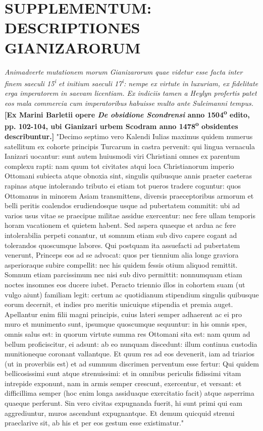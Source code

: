 \documentclass[12pt]{article}
\begin{document}
	\clearpage
	{\small
		\section{SUPPLEMENTUM: DESCRIPTIONES GIANIZARORUM}
		\textit{Animadverte mutationem morum Gianizarorum quae videtur esse facta inter finem saeculi 15\textsuperscript{i} et initium saeculi 17\textsuperscript{i}: nempe ex virtute in luxuriam, ex fidelitate erga imperatorem in saevam licentiam. Ex indiciis tamen a Heylyn profertis patet eos mala commercia cum imperatoribus habuisse multo ante Suleimanni tempus.}\\
		
		\noindent\textbf{[Ex Marini Barletii opere \textit{De obsidione Scondrensi} anno 1504\textsuperscript{o} edito, pp. 102-104, ubi Gianizari urbem Scodram anno 1478\textsuperscript{o} obsidentes describuntur.]} "Decimo septimo vero Kalendi Iulias maximus quidem numerus satellitum ex cohorte principis Turcarum in castra pervenit: qui lingua vernacula Ianizari uocantur: sunt autem huiusmodi viri Christiani omnes ex parentum complexu rapti: nam quum tot civitates atqui loca Christianorum imperio Ottomani subiecta atque obnoxia sint, singulis quibusque annis praeter caeteras rapinas atque intolerando tributo ei etiam tot pueros tradere coguntur: quos Ottomanus in minorem Asiam transmittens, diversis praeceptoribus armorum et belli peritis coalendos erudiendosque usque ad pubertatem commitit: ubi ad varios usus vitae se praecipue militae assidue exercentur: nec fere ullam temporis horam vacationem et quietem habent. Sed aspera quaeque et ardua ac fere intolerabilia perpeti conantur, ut somnum etiam sub divo capere cogant ad tolerandos quoscumque labores. Qui postquam ita assuefacti ad pubertatem venerunt, Princeps eos ad se advocat: quos per tiennium alia longe graviora asperioraque subire compellit: nec his quidem fessis otium aliquod remittit. Somnum etiam parcissimum nec nisi sub divo permittit: nonnumquam etiam noctes insomnes eos ducere iubet. Peracto triennio illos in cohortem suam (ut vulgo aiunt) familiam legit: certum ac quotidianum stipendium singulis quibusque eorum decernit, et indies pro meritis unicuique stipendia et premia auget. Apellantur enim filii magni principis, cuius lateri semper adhaerent ac ei pro muro et munimento sunt, ipsumque quoscumque sequuntur: in his omnis spes, omnis salus est: in quorum virtute summa res Ottomani sita est: nam quum ad bellum proficiscitur, ei adsunt: ab eo nunquam discedunt: illum continua custodia munitioneque coronant vallantque. Et quum res ad eos devenerit, iam ad triarios (ut in proverbiis est) et ad summum discrimen perventum esse fertur: Qui quidem bellicosissimi sunt atque strenuissimi: et in omnibus periculis fidissimi vitam intrepide exponunt, nam in armis semper crescunt, exercentur, et versant: et difficillima semper (hoc enim longa assiduaque exercitatio facit) atque asperrima quaeque perferunt. Sin vero civitas expugnanda fuerit, hi sunt primi qui eam aggrediuntur, muros ascendunt expugnantque. Et demum quicquid strenui praeclarive sit, ab his et per eos gestum esse existimatur."
		
}
\end{document}
